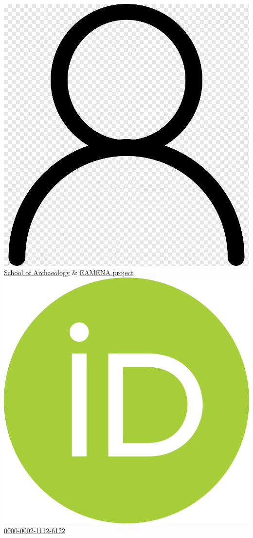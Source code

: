\documentclass{article}
\begin{document}
\includegraphics[scale=0.01]{webpro} \quad \href{https://archit.web.ox.ac.uk/people/dr-thomas-huet}{School of Archaeology} \& \href{https://eamena.org/people/dr-thomas-huet}{EAMENA project}\\
\includegraphics[scale=0.007]{orcid} \quad \href{https://orcid.org/0000-0002-1112-6122}{0000-0002-1112-6122} \\
\end{document}
